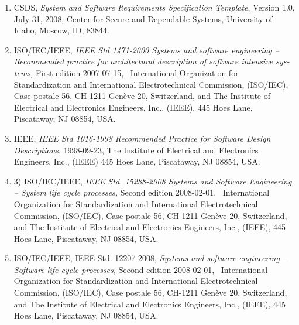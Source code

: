\documentclass[twoside,letterpaper]{article}
\newcommand\liststyleWWviiiNumii{%
\renewcommand\theenumi{\arabic{enumi}}
\renewcommand\theenumii{\arabic{enumii}}
\renewcommand\theenumiii{\arabic{enumiii}}
\renewcommand\theenumiv{\arabic{enumiv}}
\renewcommand\labelenumi{\theenumi)}
\renewcommand\labelenumii{\theenumii.}
\renewcommand\labelenumiii{\theenumiii.}
\renewcommand\labelenumiv{\theenumiv.}
}
\begin{document}
{\liststyleWWviiiNumii
\begin{enumerate}
\item {\color{black}
\foreignlanguage{english}{CSDS,
}\foreignlanguage{english}{\textit{System and Software Requirements
Specification Template}}\foreignlanguage{english}{, Version 1.0, July
31, 2008, Center for Secure and Dependable Systems, University of
Idaho, Moscow, ID, 83844.}}
\item {\color{black}
\foreignlanguage{english}{ISO/IEC/IEEE,
}\foreignlanguage{english}{\textit{IEEE Std 1471-2000 Systems and
software engineering -- Recommended practice for architectural
description of software intensive systems,}}\foreignlanguage{english}{
First edition 2007-07-15, \ International Organization for
Standardization and International Electrotechnical Commission,
(ISO/IEC), Case postale 56, CH-1211 Gen\`{e}ve 20, Switzerland, and The
Institute of Electrical and Electronics Engineers, Inc., (IEEE), 445
Hoes Lane, Piscataway, NJ 08854, USA.}}
\item {\color{black}
\foreignlanguage{english}{IEEE, }\foreignlanguage{english}{\textit{IEEE
Std 1016-1998 Recommended Practice for Software Design
Descriptions}}\foreignlanguage{english}{, 1998-09-23, The Institute of
Electrical and Electronics Engineers, Inc., (IEEE) 445 Hoes Lane,
Piscataway, NJ 08854, USA.}}
\item {\color{black}
\foreignlanguage{english}{3) ISO/IEC/IEEE,
}\foreignlanguage{english}{\textit{IEEE Std. 15288-2008 Systems and
Software Engineering -- System life cycle
processes,}}\foreignlanguage{english}{ Second edition 2008-02-01,
\ International Organization for Standardization and International
Electrotechnical Commission, (ISO/IEC), Case postale 56, CH-1211 Gen\`{e}ve
20, Switzerland, and The Institute of Electrical and Electronics
Engineers, Inc., (IEEE), 445 Hoes Lane, Piscataway, NJ 08854, USA.}}
\item {\color{black}
\foreignlanguage{english}{ISO/IEC/IEEE, IEEE Std. 12207-2008,
}\foreignlanguage{english}{\textit{Systems and software engineering --
Software life cycle processes, }}\foreignlanguage{english}{Second
edition 2008-02-01, \ International Organization for Standardization
and International Electrotechnical Commission, (ISO/IEC), Case postale
56, CH-1211 }\foreignlanguage{english}{Gen\`{e}ve 20, Switzerland, and The
Institute of Electrical and Electronics Engineers, Inc., (IEEE), 445
Hoes Lane, Piscataway, NJ 08854, USA.}}
\end{enumerate}


}
\end{document}
